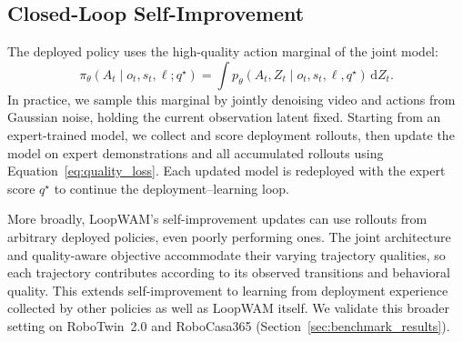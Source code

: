 \subsection{Closed-Loop Self-Improvement}
\label{sec:deployment_loop}

The deployed policy uses the high-quality action marginal of the joint model:
\begin{equation}
    \pi_\theta(A_t\mid o_t,s_t,\ell;q^\star)
    =\int p_\theta(A_t,Z_t\mid o_t,s_t,\ell,q^\star)\,\mathrm d Z_t.
    \label{eq:steered_policy}
\end{equation}
In practice, we sample this marginal by jointly denoising video and actions from Gaussian noise, holding the current observation latent fixed.
Starting from an expert-trained model, we collect and score deployment rollouts, then update the model on expert demonstrations and all accumulated rollouts using Equation~\ref{eq:quality_loss}.
Each updated model is redeployed with the expert score $q^\star$ to continue the deployment--learning loop.

More broadly, LoopWAM's self-improvement updates can use rollouts from arbitrary deployed policies, even poorly performing ones.
The joint architecture and quality-aware objective accommodate their varying trajectory qualities, so each trajectory contributes according to its observed transitions and behavioral quality.
This extends self-improvement to learning from deployment experience collected by other policies as well as LoopWAM itself.
We validate this broader setting on RoboTwin~2.0 and RoboCasa365 (Section~\ref{sec:benchmark_results}).
